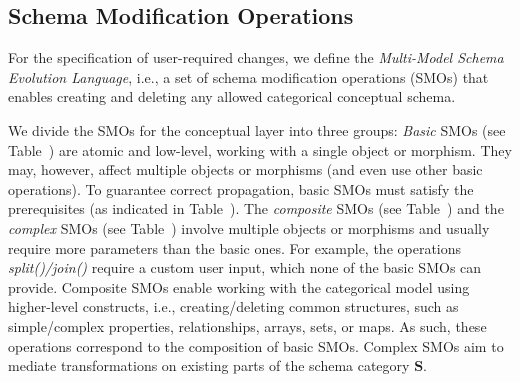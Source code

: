 \subsection{Schema Modification Operations}
For the specification of user-required changes, we define the \textit{Multi-Model Schema Evolution Language}, %
i.e., a set of schema modification operations (SMOs) that enables creating and deleting any allowed categorical conceptual schema.

We divide the SMOs for the conceptual layer into three groups: \textit{Basic} SMOs (see Table~) are atomic and low-level, working with a single object or morphism. They may, however, affect multiple objects or morphisms (and even use other basic operations). To guarantee correct propagation, basic SMOs must satisfy the prerequisites (as indicated in Table~). %
The \textit{composite} SMOs (see Table~) and the \textit{complex} SMOs (see Table~) involve multiple objects or morphisms and usually require more parameters than the basic ones. For example, the operations \textit{split()/join()} require a custom user input, which none of the basic SMOs can provide.
Composite SMOs enable working with the categorical model using higher-level constructs, i.e., creating/deleting common structures, such as simple/complex properties, relationships, arrays, sets, or maps. %
As such, these operations correspond to the composition of basic SMOs. %
Complex SMOs aim to mediate transformations on existing parts of the schema category $\mathbf{S}$.


